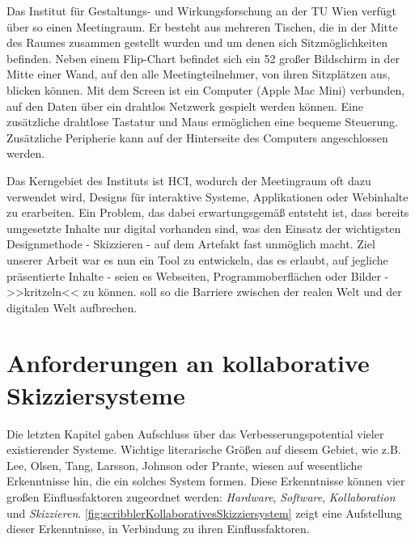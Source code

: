 \medskip Das Institut für Gestaltungs- und Wirkungsforschung an der TU Wien verfügt über so einen Meetingraum. Er besteht aus mehreren Tischen, die in der Mitte des Raumes zusammen gestellt wurden und um denen sich Sitzmöglichkeiten befinden. Neben einem Flip-Chart befindet sich ein {52\dq} großer Bildschirm in der Mitte einer Wand, auf den alle Meetingteilnehmer, von ihren Sitzplätzen aus, blicken können. Mit dem Screen ist ein Computer (Apple Mac Mini) verbunden, auf den Daten über ein drahtlos Netzwerk gespielt werden können. Eine zusätzliche drahtlose Tastatur und Maus ermöglichen eine bequeme Steuerung. Zusätzliche Peripherie kann auf der Hinterseite des Computers angeschlossen werden.

\medskip Das Kerngebiet des Instituts ist \ac{HCI}, wodurch der Meetingraum oft dazu verwendet wird, Designs für interaktive Systeme, Applikationen oder Webinhalte zu erarbeiten. Ein Problem, das dabei erwartungsgemäß entsteht ist, dass bereits umgesetzte Inhalte nur digital vorhanden sind, was den Einsatz der wichtigsten Designmethode - Skizzieren - auf dem Artefakt fast unmöglich macht. Ziel unserer Arbeit war es nun ein Tool zu entwickeln, das es erlaubt, auf jegliche präsentierte Inhalte - seien es Webseiten, Programmoberflächen oder Bilder - >>kritzeln<< zu können. \scribbler soll so die Barriere zwischen der realen Welt und der digitalen Welt aufbrechen.

\section{Anforderungen an kollaborative Skizziersysteme} \label{sec:anforderungen}
Die letzten Kapitel gaben Aufschluss über das Verbesserungspotential vieler existierender Systeme. Wichtige literarische Größen auf diesem Gebiet, wie z.B. Lee, Olsen, Tang, Larsson, Johnson oder Prante, wiesen auf wesentliche Erkenntnisse hin, die ein solches System formen. Diese Erkenntnisse können vier großen Einflussfaktoren zugeordnet werden: \emph{Hardware}, \emph{Software}, \emph{Kollaboration} und \emph{Skizzieren}. \autoref{fig:scribblerKollaborativesSkizziersystem} zeigt eine Aufstellung dieser Erkenntnisse, in Verbindung zu ihren Einflussfaktoren.

